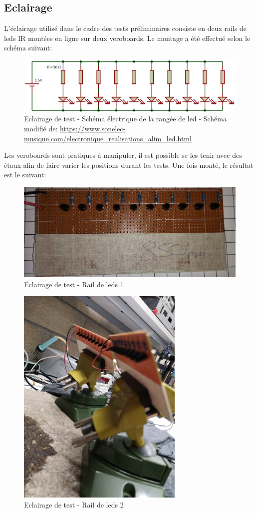 \subsection{Eclairage}
L'éclairage utilisé dans le cadre des tests préliminaires consiste en deux rails de leds IR montées en ligne sur deux veroboards.
Le montage a été effectué selon le schéma suivant:
\begin{figure}[H]
    \centering
    \includegraphics[width=13cm]{assets/figures/schema_leds1.png}
    \caption{Eclairage de test - Schéma électrique de la rangée de led - Schéma modifié de: \url{https://www.sonelec-musique.com/electronique_realisations_alim_led.html}}
\end{figure}
Les veroboards sont pratiques à manipuler, il est possible se les tenir avec des étaux afin de faire varier les positions durant les tests. Une fois monté,
le résultat est le suivant:
\begin{figure}[H]
    \centering
    \includegraphics[width=13cm]{assets/figures/rail_led1.jpg}
    \caption{Eclairage de test - Rail de leds 1}
\end{figure}

\begin{figure}[H]
    \centering
    \includegraphics[width=8cm]{assets/figures/rail_led2.jpg}
    \caption{Eclairage de test - Rail de leds 2}
\end{figure}
